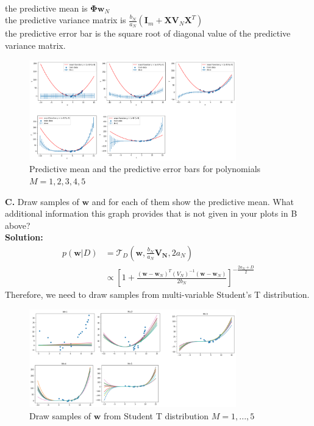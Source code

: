\documentclass{article}
\newcommand{\widefigurewidth}{0.8\textwidth}
\begin{document}
\\
the predictive mean is $\mathbf{\Phi} \mathbf{w}_N$ \\
the predictive variance matrix is $\frac{b_{N}}{a_{N}}(\mathbf{I}_m + \mathbf{X}\mathbf{V}_{N}\mathbf{X}^{T})$ \\
the predictive error bar is the square root of diagonal value of  the predictive variance matrix. \\
\begin{figure}[h!]
\centering
\includegraphics[width=\widefigurewidth]{fig/P7b1.png}
\caption{Predictive mean and the predictive error bars for polynomials $M = 1,2,3,4,5$}
\end{figure}

\newpage
\textbf{C. } Draw samples of $\mathbf{w}$ and for each of them show the predictive mean. What additional information this graph provides that is not given in your plots in B above?\\
\textbf{Solution:} \\
\begin{equation}
\begin{aligned}
    p(\mathbf{w}|D) & = \mathcal{T}_{D} (\mathbf{w}, \frac{b_{N}}{a_{N}}\mathbf{V_{N}},2a_{N}) \\ & \propto \left[1+\frac{(\mathbf{w} - \mathbf{w}_{N})^{T}(V_{N})^{-1} (\mathbf{w}-\mathbf{w}_{N})}{2b_{N}} \right]^{ - \frac{2a_{N}+D}{2}}
\end{aligned}
\end{equation}
Therefore, we need to draw samples from multi-variable Student's T distribution.

\begin{figure}[h!]
\centering
\includegraphics[width=\widefigurewidth]{fig/P7c.png}
\caption{Draw samples of $\mathbf{w}$ from Student T distribution $M = 1,...,5$}
\end{figure}
\end{document}
